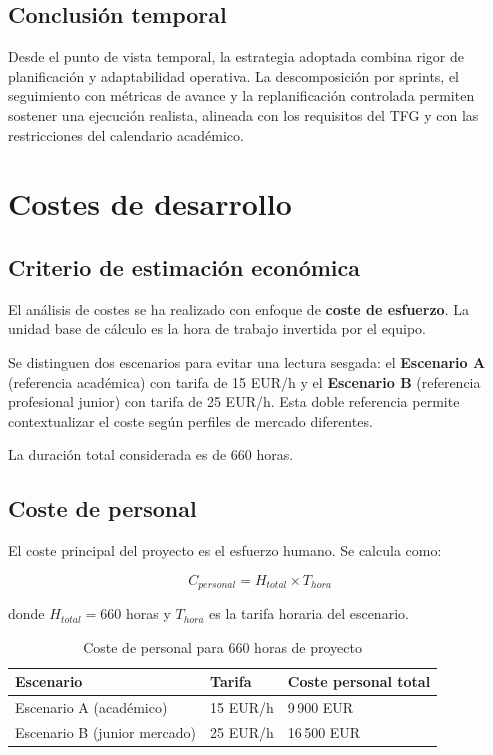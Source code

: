 \subsection{Conclusi\'on temporal}

Desde el punto de vista temporal, la estrategia adoptada combina rigor de planificaci\'on
y adaptabilidad operativa. La descomposici\'on por sprints, el seguimiento con m\'etricas de avance
y la replanificaci\'on controlada permiten sostener una ejecuci\'on realista,
alineada con los requisitos del TFG y con las restricciones del calendario acad\'emico.

\FloatBarrier
\section{Costes de desarrollo}		

\subsection{Criterio de estimaci\'on econ\'omica}

El an\'alisis de costes se ha realizado con enfoque de \textbf{coste de esfuerzo}.
La unidad base de c\'alculo es la hora de trabajo invertida por el equipo.

Se distinguen dos escenarios para evitar una lectura sesgada: el \textbf{Escenario A} (referencia acad\'emica) con tarifa de 15 EUR/h y el \textbf{Escenario B} (referencia profesional junior) con tarifa de 25 EUR/h. Esta doble referencia permite contextualizar el coste seg\'un perfiles de mercado diferentes.

La duraci\'on total considerada es de 660 horas.

\subsection{Coste de personal}

El coste principal del proyecto es el esfuerzo humano. Se calcula como:

\[
C_{personal} = H_{total} \times T_{hora}
\]

donde $H_{total}=660$ horas y $T_{hora}$ es la tarifa horaria del escenario.

\begin{table}[!htbp]
\centering
\begin{tabular}{|P{5.5cm}|P{2.8cm}|P{3.8cm}|}
\hline
\textbf{Escenario} & \textbf{Tarifa} & \textbf{Coste personal total} \\
\hline
Escenario A (acad\'emico) & 15 EUR/h & 9\,900 EUR \\
\hline
Escenario B (junior mercado) & 25 EUR/h & 16\,500 EUR \\
\hline
\end{tabular}
\caption{Coste de personal para 660 horas de proyecto}
\label{tab:coste-personal-total}
\end{table}

